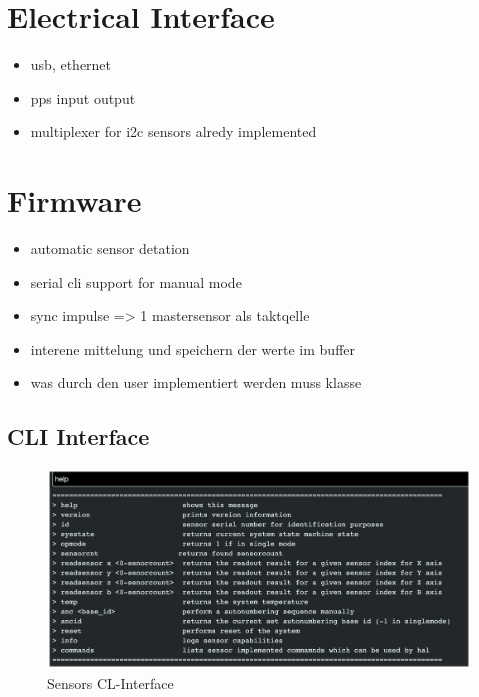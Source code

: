 \hypertarget{electrical-interface}{%
\section{Electrical Interface}\label{electrical-interface}}

\begin{itemize}
\tightlist
\item
  usb, ethernet
\item
  pps input output
\item
  multiplexer for i2c sensors alredy implemented
\end{itemize}

\hypertarget{firmware}{%
\section{Firmware}\label{firmware}}

\begin{itemize}
\tightlist
\item
  automatic sensor detation
\item
  serial cli support for manual mode
\item
  sync impulse =\textgreater{} 1 mastersensor als taktqelle
\item
  interene mittelung und speichern der werte im buffer
\item
  was durch den user implementiert werden muss klasse
\end{itemize}

\hypertarget{cli-interface}{%
\subsection{CLI Interface}\label{cli-interface}}

\begin{figure}
\centering
\includegraphics{./generated_images/border_Sensors_CL-Interface.png}
\caption{Sensors CL-Interface \label{Sensors_CL-Interface.png}}
\end{figure}

